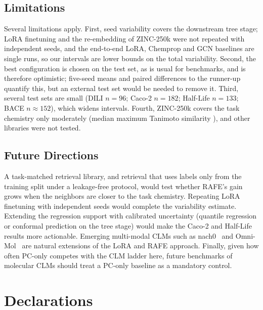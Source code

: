 \documentclass[pdflatex,sn-mathphys-num,Numbered]{sn-jnl}%
\begin{document}
\subsection{Limitations}\label{sec:limitations}
Several limitations apply. First, seed variability covers the downstream tree stage; LoRA finetuning and the re-embedding of ZINC-250k were not repeated with independent seeds, and the end-to-end LoRA, Chemprop and GCN baselines are single runs, so our intervals are lower bounds on the total variability. Second, the best configuration is chosen on the test set, as is usual for benchmarks, and is therefore optimistic; five-seed means and paired differences to the runner-up quantify this, but an external test set would be needed to remove it. Third, several test sets are small (DILI $n=96$; Caco-2 $n=182$; Half-Life $n=133$; BACE $n\approx152$), which widens intervals. Fourth, ZINC-250k covers the task chemistry only moderately (median maximum Tanimoto similarity \covmedian{}), and other libraries were not tested. 

\subsection{Future Directions}\label{sec:future_work}
A task-matched retrieval library, and retrieval that uses labels only from the training split under a leakage-free protocol, would test whether RAFE's gain grows when the neighbors are closer to the task chemistry. Repeating LoRA finetuning with independent seeds would complete the variability estimate. Extending the regression support with calibrated uncertainty (quantile regression or conformal prediction on the tree stage) would make the Caco-2 and Half-Life results more actionable. Emerging multi-modal CLMs such as nach0~\cite{livne2024nach0} and Omni-Mol~\cite{hu2025omnimol} are natural extensions of the LoRA and RAFE approach. Finally, given how often PC-only competes with the CLM ladder here, future benchmarks of molecular CLMs should treat a PC-only baseline as a mandatory control.

\backmatter

\section*{Declarations}
\end{document}
